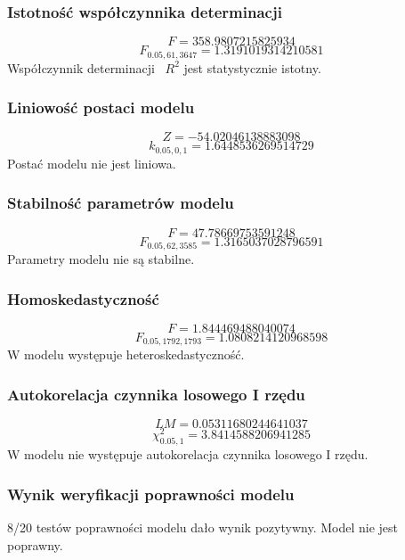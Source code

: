 \subsubsection{Istotność współczynnika determinacji}
\[F = 358.9807215825934\]
\[F_{0.05, 61, 3647} = 1.3191019314210581\]
Współczynnik determinacji ~$R^2$ jest statystycznie istotny.
\subsubsection{Liniowość postaci modelu}
\[Z = -54.02046138883098\]
\[k_{0.05, 0, 1} = 1.6448536269514729\]
Postać modelu nie jest liniowa.
\subsubsection{Stabilność parametrów modelu}
\[F = 47.78669753591248\]
\[F_{0.05, 62, 3585} = 1.3165037028796591\]
Parametry modelu nie są stabilne.
\subsubsection{Homoskedastyczność}
\[F = 1.844469488040074\]
\[F_{0.05, 1792, 1793} = 1.0808214120968598\]
W modelu występuje heteroskedastyczność.
\subsubsection{Autokorelacja czynnika losowego I rzędu}
\[LM = 0.05311680244641037\]
\[\chi^2_{0.05, 1} = 3.8414588206941285\]
W modelu nie występuje autokorelacja czynnika losowego I rzędu.
\subsubsection{Wynik weryfikacji poprawności modelu}
8/20 testów poprawności modelu dało wynik pozytywny. Model nie jest poprawny.
